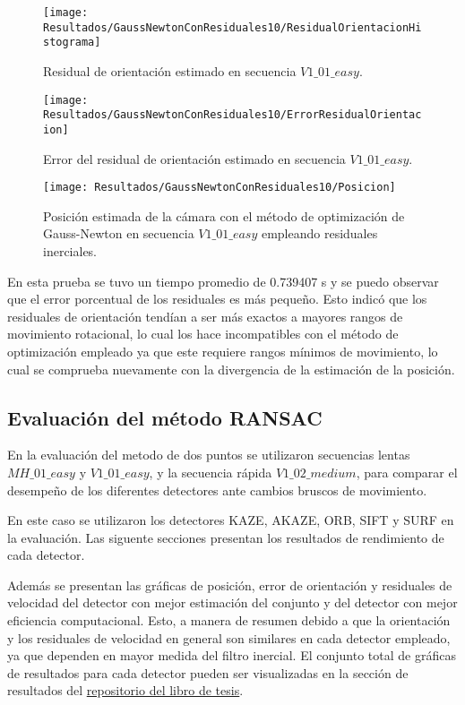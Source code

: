 \begin{figure}[H]
	\centering
	\texttt{[image: Resultados/GaussNewtonConResiduales10/ResidualOrientacionHistograma]}
	\caption{ Residual de orientación estimado en secuencia $V1\_ 01\_ easy$.}
	\label{imagen:Resultados/GaussNewtonConResiduales10/ResidualOrientacionHistograma}
\end{figure}

\begin{figure}[H]
	\centering
	\texttt{[image: Resultados/GaussNewtonConResiduales10/ErrorResidualOrientacion]}
	\caption{ Error del residual de orientación estimado en secuencia $V1\_ 01\_ easy$.}
	\label{imagen:Resultados/GaussNewtonConResiduales10/ErrorResidualOrientacion}
\end{figure}


\begin{figure}[H]
	\centering
	\texttt{[image: Resultados/GaussNewtonConResiduales10/Posicion]}
	\caption{Posición estimada de la cámara con el método de optimización de Gauss-Newton en secuencia $V1\_ 01\_ easy$ empleando residuales inerciales. }
	\label{imagen:Resultados/GaussNewtonConResiduales10/Posicion}
\end{figure}

En esta prueba se tuvo un tiempo promedio de 0.739407 s y se puedo observar que el error porcentual de los residuales es más pequeño. Esto indicó que los residuales de orientación tendían a ser más exactos a mayores rangos de movimiento rotacional, lo cual los hace incompatibles con el método de optimización empleado ya que este requiere rangos mínimos de movimiento, lo cual se comprueba nuevamente con la divergencia de la estimación de la posición.

\subsection{Evaluación del método RANSAC}

En la evaluación del metodo de dos puntos se utilizaron secuencias lentas $MH\_ 01\_ easy$ y $V1\_ 01\_ easy$, y la secuencia rápida $V1\_ 02\_ medium$, para comparar el desempeño de los diferentes detectores ante cambios bruscos de movimiento. 

En este caso se utilizaron los detectores KAZE, AKAZE, ORB, SIFT y SURF en la evaluación. Las siguente secciones presentan los resultados de rendimiento de cada detector.

 Además se presentan las gráficas de posición, error de orientación y residuales de velocidad del detector con mejor estimación del conjunto y del detector con mejor eficiencia computacional. Esto, a manera de resumen debido a que la orientación y los residuales de velocidad en general son similares en cada detector empleado, ya que dependen en mayor medida del filtro inercial.  El conjunto total de gráficas de resultados para cada detector pueden ser visualizadas en la sección de resultados del  \href{https://github.com/Lujano/tesis/tree/master/imagenes/Resultados/}{\underline{repositorio del libro de tesis}}.
 
